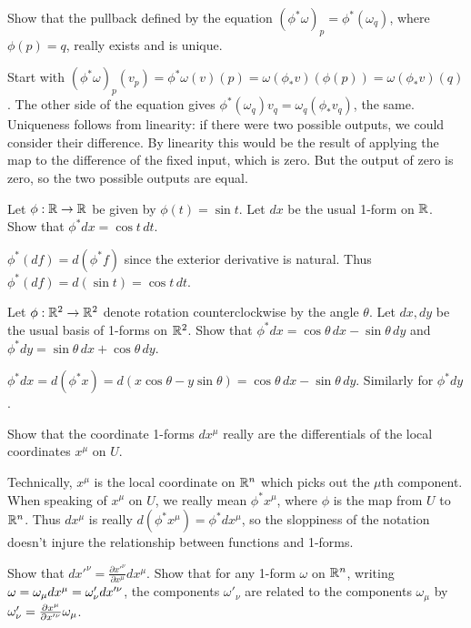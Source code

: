 {\begin{p}{Show that the pullback defined by the equation $(\phi^*\omega)_p=\phi^*(\omega_q)$, where $\phi(p)=q$,
really exists and is unique.}
\end{p}

Start with  $(\phi^*\omega)_p(v_p)=\phi^*\omega(v)(p)=\omega(\phi_*v)(\phi(p))=\omega(\phi_*v)(q)$. The other 
side of the equation gives $\phi^*(\omega_q)v_q=\omega_q(\phi_* v_q)$, the same. Uniqueness follows from linearity: if there were
two possible outputs, we could consider their difference. By linearity this would be the result of applying the map to the difference of the
fixed input, which is zero. But the output of zero is zero, so the two possible outputs are equal.\\

\begin{p}{Let $\phi:\mathbb{R}\rightarrow \mathbb{R}$ be given by $\phi(t)=\sin t$. Let $dx$ be the usual
1-form on $\mathbb{R}$. Show that $\phi^*dx=\cos t\,dt$.}
\end{p}

$\phi^*(df)=d(\phi^*f)$ since the exterior derivative is natural. Thus $\phi^*(df)=d(\sin t)=\cos t\,dt$.

\begin{p}{Let $\phi:\mathbb{R}^2\rightarrow \mathbb{R}^2$ denote rotation counterclockwise by the 
angle $\theta$. Let $dx, dy$ be the usual basis of 1-forms on $\mathbb{R}^2$. Show that $\phi^*dx=\cos\theta\,dx-\sin\theta\,dy$
and $\phi^*dy=\sin\theta\,dx+\cos\theta\,dy$. }
\end{p}

$\phi^*dx=d(\phi^*x)=d(x\cos\theta-y\sin\theta)=\cos\theta\,dx-\sin\theta\,dy$. Similarly for $\phi^*dy$. 

\begin{p}{Show that the coordinate 1-forms $dx^\mu$ really are the differentials of the local coordinates $x^\mu$ on $U$.}
\end{p}

Technically, $x^\mu$ is the local coordinate on $\mathbb{R}^n$ which picks out the $\mu$th component. When speaking
of $x^\mu$ on $U$, we really mean $\phi^*x^\mu$, where $\phi$ is the map from $U$ to $\mathbb{R}^n$. Thus
$dx^\mu$ is really $d(\phi^*x^\mu)=\phi^*dx^\mu$, so the sloppiness of the notation doesn't injure the relationship
between functions and 1-forms.

\begin{p}{Show that $dx'^\nu=\frac{\partial x'^\nu}{\partial x^\mu}dx^\mu$. Show that for any 1-form $\omega$ on $\mathbb{R}^n$,
writing $\omega=\omega_\mu dx^\mu=\omega'_\nu dx'^\nu$, the components $\omega'_\nu$ are related to the components $\omega_\mu$ by
$\omega'_\nu=\frac{\partial x^\mu}{\partial x'^\nu}\omega_\mu$.}
\end{p}

}
